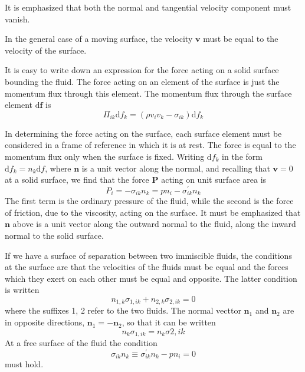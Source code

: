 \documentclass[conference]{IEEEtran}
\theoremstyle{definition}
\theoremstyle{remark}
\begin{document}
    It is emphasized that both the normal and tangential velocity component must vanish.

    In the general case of a moving surface, the velocity $\mathbf{v}$ must be equal to the velocity of the surface.

    It is easy to write down an expression for the force acting on a solid surface bounding the fluid. The force acting on an element of the surface is just the momentum flux through this element. The momentum flux through the surface element $\mathrm{d} \mathbf{f}$ is
    \[
        \Pi_{ik} \mathrm{d} f_k = (\rho v_i v_k - \sigma_{ik}) \mathrm{d} f_k
    \]

    In determining the force acting on the surface, each surface element must be considered in a frame of reference in which it is at rest. The force is equal to the momentum flux only when the surface is fixed. Writing $\mathrm{d} f_k$ in the form $\mathrm{d} f_k = n_k \mathrm{d} f$, where $\mathbf{n}$ is a unit vector along the normal, and recalling that $\mathbf{v} = 0$ at a solid surface, we find that the force $\mathbf{P}$ acting on unit surface area is
    \begin{equation}
        P_i = -\sigma_{ik} n_k = p n_i - \sigma^\prime_{ik} n_k
    \end{equation}
    The first term is the ordinary pressure of the fluid, while the second is the force of friction, due to the viscosity, acting on the surface. It must be emphasized that $\mathbf{n}$ above is a unit vector along the outward normal to the fluid, along the inward normal to the solid surface.

    If we have a surface of separation between two immiscible fluids, the conditions at the surface are that the velocities of the fluids must be equal and the forces which they exert on each other must be equal and opposite. The latter condition is written
    \[
        n_{1, k} \sigma_{1, ik} + n_{2, k} \sigma_{2, ik} = 0
    \]
    where the suffixes 1, 2 refer to the two fluids. The normal vecttor $\mathbf{n}_1$ and $\mathbf{n}_2$ are in opposite directions, $\mathbf{n}_1 = -\mathbf{n}_2$, so that it can be written
    \begin{equation}
        n_k \sigma_{1, ik} = n_k \sigma{2, ik}
    \end{equation}
    At a free surface of the fluid the condition
    \begin{equation}
        \sigma_{ik} n_{k}  \equiv \sigma_{ik}^\prime n_k - p n_i = 0
    \end{equation}
    must hold.
\end{document}
